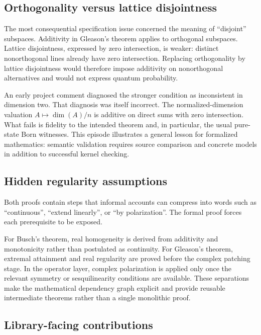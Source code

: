 \documentclass[pdflatex,sn-mathphys-num]{sn-jnl}
\theoremstyle{thmstyleone}
\theoremstyle{thmstylethree}
\begin{document}
\subsection{Orthogonality versus lattice disjointness}\label{orthogonality-versus-lattice-disjointness}

The most consequential specification issue concerned the meaning of ``disjoint'' subspaces. Additivity in Gleason's theorem applies to orthogonal subspaces. Lattice disjointness, expressed by zero intersection, is weaker: distinct nonorthogonal lines already have zero intersection. Replacing orthogonality by lattice disjointness would therefore impose additivity on nonorthogonal alternatives and would not express quantum probability.

An early project comment diagnosed the stronger condition as inconsistent in dimension two. That diagnosis was itself incorrect. The normalized-dimension valuation \(A\mapsto\dim(A)/n\) is additive on direct sums with zero intersection. What fails is fidelity to the intended theorem and, in particular, the usual pure-state Born witnesses. This episode illustrates a general lesson for formalized mathematics: semantic validation requires source comparison and concrete models in addition to successful kernel checking.

\subsection{Hidden regularity assumptions}\label{hidden-regularity-assumptions}

Both proofs contain steps that informal accounts can compress into words such as ``continuous'', ``extend linearly'', or ``by polarization''. The formal proof forces each prerequisite to be exposed.

For Busch's theorem, real homogeneity is derived from additivity and monotonicity rather than postulated as continuity. For Gleason's theorem, extremal attainment and real regularity are proved before the complex patching stage. In the operator layer, complex polarization is applied only once the relevant symmetry or sesquilinearity conditions are available. These separations make the mathematical dependency graph explicit and provide reusable intermediate theorems rather than a single monolithic proof.

\subsection{Library-facing contributions}\label{library-facing-contributions}
\end{document}
